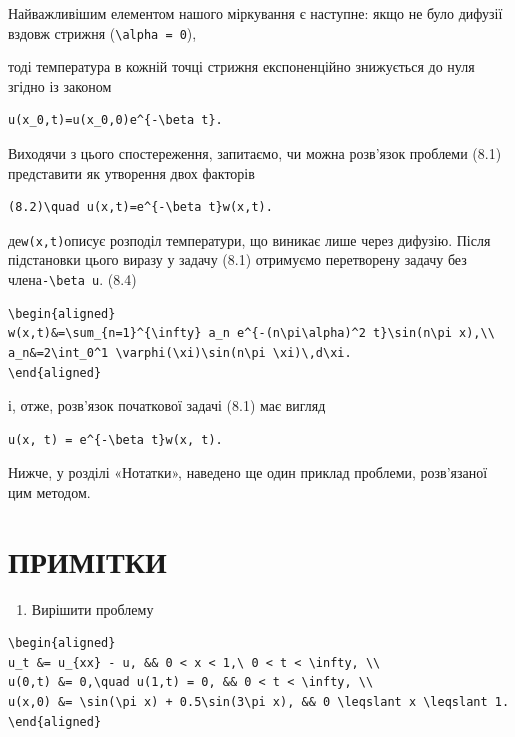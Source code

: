 \documentclass[
  ukrainian,
]{article}
\providecommand{\tightlist}{%
  \setlength{\itemsep}{0pt}\setlength{\parskip}{0pt}}
\begin{document}
Найважливішим елементом нашого міркування є наступне: якщо не було
дифузії вздовж стрижня (\texttt{\textbackslash{}alpha\ =\ 0}),

тоді температура в кожній точці стрижня експоненційно знижується до нуля
згідно із законом

\begin{verbatim}
u(x_0,t)=u(x_0,0)e^{-\beta t}.
\end{verbatim}

Виходячи з цього спостереження, запитаємо, чи можна розв'язок проблеми
(8.1) представити як утворення двох факторів

\begin{verbatim}
(8.2)\quad u(x,t)=e^{-\beta t}w(x,t).
\end{verbatim}

де\texttt{w(x,t)}описує розподіл температури, що виникає лише через
дифузію. Після підстановки цього виразу у задачу (8.1) отримуємо
перетворену задачу без члена\texttt{-\textbackslash{}beta\ u}. (8.4)

\begin{verbatim}
\begin{aligned}
w(x,t)&=\sum_{n=1}^{\infty} a_n e^{-(n\pi\alpha)^2 t}\sin(n\pi x),\\
a_n&=2\int_0^1 \varphi(\xi)\sin(n\pi \xi)\,d\xi.
\end{aligned}
\end{verbatim}

і, отже, розв'язок початкової задачі (8.1) має вигляд

\begin{verbatim}
u(x, t) = e^{-\beta t}w(x, t).
\end{verbatim}

Нижче, у розділі «Нотатки», наведено ще один приклад проблеми,
розв'язаної цим методом.

\section{ПРИМІТКИ}\label{ux43fux440ux438ux43cux456ux442ux43aux438}

\begin{enumerate}
\def\labelenumi{\arabic{enumi}.}
\tightlist
\item
  Вирішити проблему
\end{enumerate}

\begin{verbatim}
\begin{aligned}
u_t &= u_{xx} - u, && 0 < x < 1,\ 0 < t < \infty, \\
u(0,t) &= 0,\quad u(1,t) = 0, && 0 < t < \infty, \\
u(x,0) &= \sin(\pi x) + 0.5\sin(3\pi x), && 0 \leqslant x \leqslant 1.
\end{aligned}
\end{verbatim}
\end{document}
